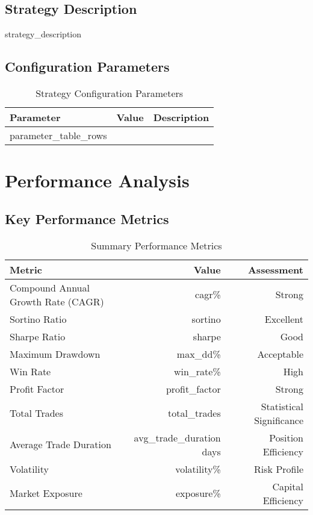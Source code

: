 \documentclass[11pt,a4paper]{article}
\begin{document}
\subsection{Strategy Description}
{{strategy_description}}

\subsection{Configuration Parameters}
\begin{table}[H]
\centering
\caption{Strategy Configuration Parameters}
\begin{tabular}{lll}
\toprule
\textbf{Parameter} & \textbf{Value} & \textbf{Description} \\
\midrule
{{parameter_table_rows}}
\bottomrule
\end{tabular}
\end{table}

\section{Performance Analysis}

\subsection{Key Performance Metrics}
\begin{table}[H]
\centering
\caption{Summary Performance Metrics}
\begin{tabular}{lrr}
\toprule
\textbf{Metric} & \textbf{Value} & \textbf{Assessment} \\
\midrule
Compound Annual Growth Rate (CAGR) & {{cagr}}\% & \textcolor{profit}{Strong} \\
Sortino Ratio & {{sortino}} & \textcolor{profit}{Excellent} \\
Sharpe Ratio & {{sharpe}} & \textcolor{neutral}{Good} \\
Maximum Drawdown & {{max_dd}}\% & \textcolor{loss}{Acceptable} \\
Win Rate & {{win_rate}}\% & \textcolor{profit}{High} \\
Profit Factor & {{profit_factor}} & \textcolor{profit}{Strong} \\
Total Trades & {{total_trades}} & Statistical Significance \\
Average Trade Duration & {{avg_trade_duration}} days & Position Efficiency \\
Volatility & {{volatility}}\% & Risk Profile \\
Market Exposure & {{exposure}}\% & Capital Efficiency \\
\bottomrule
\end{tabular}
\end{table}
\end{document}
